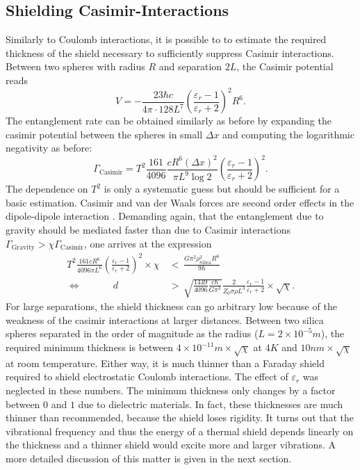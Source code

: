 \subsection{Shielding Casimir-Interactions}
Similarly to Coulomb interactions, it is possible to to estimate the required thickness of the shield necessary to sufficiently suppress Casimir interactions. Between two spheres with radius $R$ and separation $2L$, the Casimir potential reads \cite{Emig_2007}
\begin{equation}
  V = -\frac{23 \hbar c}{4\pi \cdot 128 L^7} \left( \frac{\varepsilon_r - 1}{\varepsilon_r + 2} \right)^2 R^6 .
\end{equation}
The entanglement rate can be obtained similarly as before by expanding the casimir potential between the spheres in small $\Delta x$ and computing the logarithmic negativity as before:
\begin{equation}
  \Gamma_\mathrm{Casimir} = T^2 \frac{161}{4096} \frac{c R^6 (\Delta x)^2}{\pi L^9 \log 2}\left( \frac{\varepsilon_r - 1}{\varepsilon_r + 2}\right)^2 .
\end{equation}
The dependence on $T^2$ is only a systematic guess but should be sufficient for a basic estimation. Casimir and van der Waals forces are second order effects in the dipole-dipole interaction \cite{Bordag_2001}.
Demanding again, that the entanglement due to gravity should be mediated faster than due to Casimir interactions $\Gamma_\mathrm{Gravity} > \chi \Gamma_\mathrm{Casimir}$, one arrives at the expression
\begin{align}
  T^2 \frac{161 c R^6}{4096 \pi L^6} \left( \frac{\varepsilon_r - 1}{\varepsilon_r + 2}\right)^2 \times \chi \, &< \, \frac{G \pi^2 \rho_\mathrm{Silica}^2 R^6}{9\hbar} \\
  \Longleftrightarrow \quad\quad\quad\  d \, &> \, \sqrt{\frac{1449}{4096} \frac{c \hbar}{G \pi^3}} \frac{2}{Z_0 \sigma \rho L^3} \frac{\varepsilon_r - 1}{\varepsilon_r + 2} \times \sqrt{\chi} .
\end{align}
For large separations, the shield thickness can go arbitrary low because of the weakness of the casimir interactions at larger distances. Between two silica spheres separated in the order of magnitude as the radius ($L = 2\times 10^{-5}\si{m}$), the required minimum thickness is between $4\times 10^{-11}\si{m} \times \sqrt{\chi}$ at $4\si{K}$ and $10 \si{nm}\times \sqrt{\chi}$ at room temperature.
Either way, it is much thinner than a Faraday shield required to shield electrostatic Coulomb interactions. The effect of $\varepsilon_r$ was neglected in these numbers. The minimum thickness only changes by a factor between $0$ and $1$ due to dielectric materials.
In fact, these thicknesses are much thinner than recommended, because the shield loses rigidity.
It turns out that the vibrational frequency and thus the energy of a thermal shield depends linearly on the thickness and a thinner shield would excite more and larger vibrations. A more detailed discussion of this matter is given in the next section.


